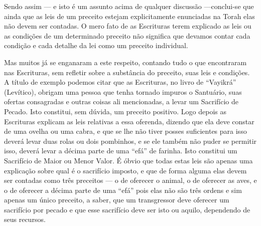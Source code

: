 Sendo assim --- e isto é um assunto acima de qualquer discussão
---conclui-se que ainda que as leis de um preceito estejam
explicitamente enun­ciadas na Torah elas não devem ser contadas. O mero
fato de as Escrituras te­rem explicado as leis ou as condições de um
determinado preceito não signifi­ca que devamos contar cada condição e
cada detalhe da lei como um preceito individual.

Mas muitos já se enganaram a este respeito, contando tudo o que
encontraram nas Escrituras, sem refletir sobre a substância do preceito,
suas leis e condições. A título de exemplo podemos citar que as
Escrituras, no livro de ``Vayikrá'' (Levítico), obrigam uma pessoa que
tenha tornado impuros o San­tuário, suas ofertas consagradas e outras
coisas ali mencionadas, a levar um Sa­crifício de Pecado. Isto
constitui, sem dúvida, um preceito positivo. Logo de­pois as Escrituras
explicam as leis relativas a essa oferenda, dizendo que ela de­ve
constar de uma ovelha ou uma cabra, e que se lhe não tiver posses
suficien­tes para isso deverá levar duas rolas ou dois pombinhos, e se
ele também não puder se permitir isso, deverá levar a décima parte de
uma ``efá'' de farinha. Isto constitui um Sacrifício de Maior ou Menor
Valor. É óbvio que todas estas leis são apenas uma explicação sobre qual
é o sacrifício imposto, e que de for­ma alguma elas devem ser contadas
como três preceitos --- o de oferecer o ani­mal, o de oferecer as aves,
e o de oferecer a décima parte de uma ``efá'' pois elas não são três
ordens e sim apenas um único preceito, a saber, que um transgressor deve
oferecer um sacrifício por pecado e que esse sacrifício deve ser isto ou
aquilo, dependendo de seus recursos.

